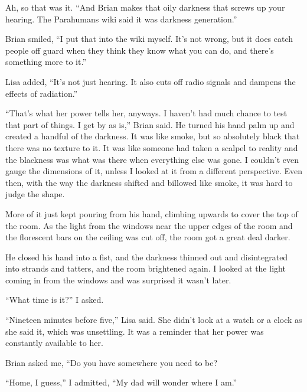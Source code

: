 Ah, so that was it.  ``And Brian makes that oily darkness that screws up your hearing.  The Parahumans wiki said it was darkness generation.''



Brian smiled, ``I put that into the wiki myself.  It's not wrong, but it does catch people off guard when they think they know what you can do, and there's something more to it.''



Lisa added, ``It's not just hearing.  It also cuts off radio signals and dampens the effects of radiation.''



``That's what her power tells her, anyways.  I haven't had much chance to test that part of things.  I get by as is,'' Brian said.  He turned his hand palm up and created a handful of the darkness.  It was like smoke, but so absolutely black that there was no texture to it.  It was like someone had taken a scalpel to reality and the blackness was what was there when everything else was gone.  I couldn't even gauge the dimensions of it, unless I looked at it from a different perspective.  Even then, with the way the darkness shifted and billowed like smoke, it was hard to judge the shape.



More of it just kept pouring from his hand, climbing upwards to cover the top of the room.  As the light from the windows near the upper edges of the room and the florescent bars on the ceiling was cut off, the room got a great deal darker.



He closed his hand into a fist, and the darkness thinned out and disintegrated into strands and tatters, and the room brightened again.  I looked at the light coming in from the windows and was surprised it wasn't later.



``What time is it?''  I asked.



``Nineteen minutes before five,'' Lisa said.  She didn't look at a watch or a clock as she said it, which was unsettling.  It was a reminder that her power was constantly available to her.



Brian asked me, ``Do you have somewhere you need to be?



``Home, I guess,'' I admitted, ``My dad will wonder where I am.''




